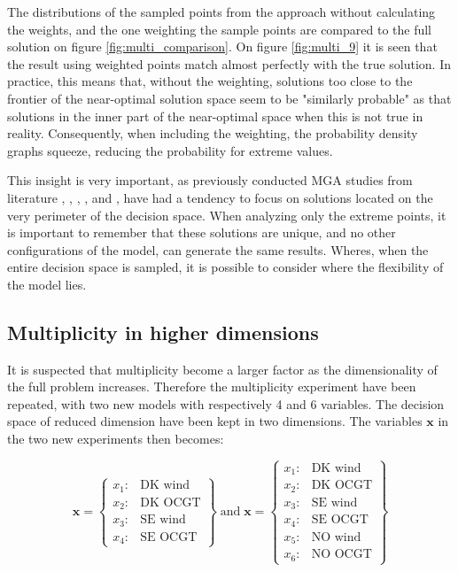 The distributions of the sampled points from the approach without calculating the weights, and the one weighting the sample points are compared to the full solution on figure \ref{fig:multi_comparison}. On figure \ref{fig:multi_9} it is seen that the result using weighted points match almost perfectly with the true solution. In practice, this means that, without the weighting, solutions too close to the frontier of the near-optimal solution space seem to be "similarly probable" as that solutions in the inner part of the near-optimal space when this is not true in reality. 
Consequently, when including the weighting, the probability density graphs squeeze, reducing the probability for extreme values. 


This insight is very important, as previously conducted MGA studies from literature \cite{DECAROLIS2016}, \cite{MGA_Price}, \cite{BERNTSEN2017886}, \cite{Yavuz2011}, \cite{Optimum_not_enough} and \cite{Fabian_MGA}, have had a tendency to focus on solutions located on the very perimeter of the decision space. When analyzing only the extreme points, it is important to remember that these solutions are unique, and no other configurations of the model, can generate the same results. Wheres, when the entire decision space is sampled, it is possible to consider where the flexibility of the model lies. 

\subsection{Multiplicity in higher dimensions}

It is suspected that multiplicity become a larger factor as the dimensionality of the full problem increases. Therefore the multiplicity experiment have been repeated, with two new models with respectively 4 and 6 variables. The decision space of reduced dimension have been kept in two dimensions. The variables $\mathbf{x}$ in the two new experiments then becomes:

\begin{equation*}
\mathbf{x} = 
\begin{Bmatrix}
x_1:& \text{DK wind} \\
x_2:& \text{DK OCGT} \\
x_3:& \text{SE wind} \\
x_4:& \text{SE OCGT} 
\end{Bmatrix}
\; \text{and} \; 
\mathbf{x} = 
\begin{Bmatrix}
x_1:& \text{DK wind} \\
x_2:& \text{DK OCGT} \\
x_3:& \text{SE wind} \\
x_4:& \text{SE OCGT} \\
x_5:& \text{NO wind} \\
x_6:& \text{NO OCGT} 
\end{Bmatrix}
\end{equation*}

